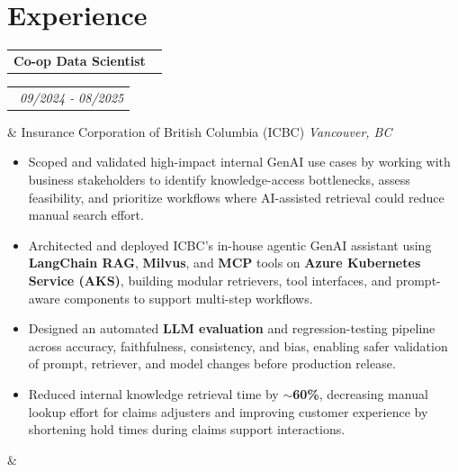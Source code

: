 \documentclass[11pt,a4paper,sans]{moderncv}
\makeatletter
\newcommand*{\customcventry}[7][.13em]{
\begin{tabular}{@{}l}
{\bfseries #4} \
{\itshape #3}
\end{tabular}
\hfill
\begin{tabular}{l@{}}
{\bfseries #5} \
{\itshape #2}
\end{tabular}
\ifx&#7&%
\else{\
\begin{minipage}{\maincolumnwidth}%
\small#7%
\end{minipage}}\fi%
\par\addvspace{#1}}
\makeatother
\begin{document}
\section{Experience}

\customcventry{09/2024 ‐ 08/2025}{}{Co-op Data Scientist}{}{}{
	\vspace{4pt}
	Insurance Corporation of British Columbia (ICBC) \hfill \textit{Vancouver, BC}
	\vspace{2pt}
	\begin{itemize}[leftmargin=0.6cm, label={\textbullet}]
        \item Scoped and validated high-impact internal GenAI use cases by working with business stakeholders to identify knowledge-access bottlenecks, assess feasibility, and prioritize workflows where AI-assisted retrieval could reduce manual search effort.
        \vspace{-4pt}
        \item Architected and deployed ICBC’s in-house agentic GenAI assistant using \textbf{LangChain RAG}, \textbf{Milvus}, and \textbf{MCP} tools on \textbf{Azure Kubernetes Service (AKS)}, building modular retrievers, tool interfaces, and prompt-aware components to support multi-step workflows.
        \vspace{-4pt}
        \item Designed an automated \textbf{LLM evaluation} and regression-testing pipeline across accuracy, faithfulness, consistency, and bias, enabling safer validation of prompt, retriever, and model changes before production release.
        \vspace{-4pt}
        \item Reduced internal knowledge retrieval time by \textbf{$\sim$60\%}, decreasing manual lookup effort for claims adjusters and improving customer experience by shortening hold times during claims support interactions.
        \vspace{-4pt}
    \end{itemize}
}

\vspace{6pt}
\end{document}
